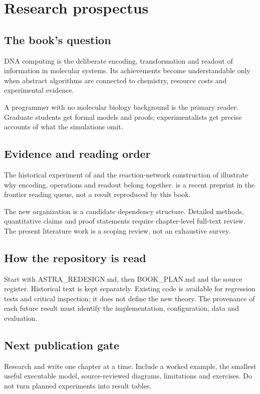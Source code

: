 \chapter*{Research prospectus}
\renewcommand{\thefigure}{P.\arabic{figure}}
\renewcommand{\thedefinition}{P.\arabic{definition}}
\renewcommand{\theproposition}{P.\arabic{proposition}}
\section*{The book's question}
DNA computing is the deliberate encoding, transformation and readout of information in molecular systems. Its achievements become understandable only when abstract algorithms are connected to chemistry, resource costs and experimental evidence.

A programmer with no molecular biology background is the primary reader. Graduate students get formal models and proofs; experimentalists get precise accounts of what the simulations omit.
\section*{Evidence and reading order}
The historical experiment of \citet{adleman1994} and the reaction-network
construction of \citet{soloveichik2010} illustrate why encoding, operations and
readout belong together. \citet{zhu2026} is a recent preprint in the frontier
reading queue, not a result reproduced by this book.

The new organization is a candidate dependency structure. Detailed methods,
quantitative claims and proof statements require chapter-level full-text review.
The present literature work is a scoping review, not an exhaustive survey.

\section*{How the repository is read}
Start with ASTRA\_REDESIGN.md, then BOOK\_PLAN.md and the source register.
Historical text is kept separately. Existing code is available for regression
tests and critical inspection; it does not define the new theory.
The \gls{provenance} of each future result must identify the
implementation, configuration, data and evaluation.

\section*{Next publication gate}
Research and write one chapter at a time. Include a worked example, the smallest
useful executable model, source-reviewed diagrams, limitations and exercises.
Do not turn planned experiments into result tables.

